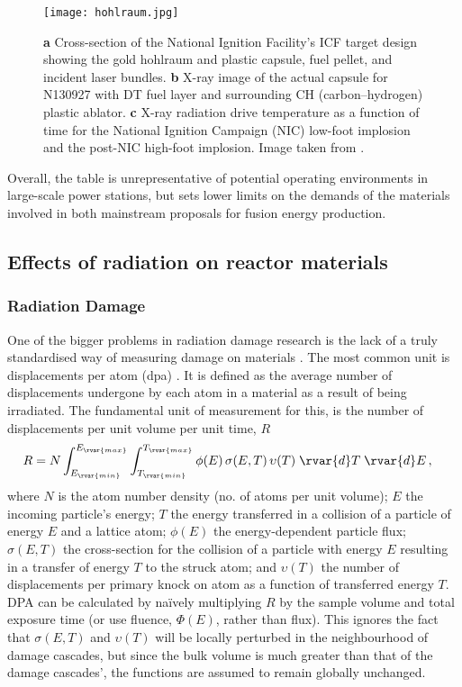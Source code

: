 \begin{figure}
  \centering
  \texttt{[image: hohlraum.jpg]}
  \caption[Hohlraum design for indirect drive in Inertial Confinement Fusion.]{\textbf{a} Cross-section of the National Ignition Facility's ICF target design showing the gold hohlraum and plastic capsule, fuel pellet, and incident laser bundles. \textbf{b} X-ray image of the actual capsule for N130927 with DT fuel layer and surrounding CH (carbon–hydrogen) plastic ablator. \textbf{c} X-ray radiation drive temperature as a function of time for the National Ignition Campaign (NIC) low-foot implosion and the post-NIC high-foot implosion. Image taken from \cite{hohlraum}.}
  \label{f:hohlraum}
\end{figure}

Overall, the table is unrepresentative of potential operating environments in large-scale power stations, but sets lower limits on the demands of the materials involved in both mainstream proposals for fusion energy production.

\subsection{Effects of radiation on reactor materials}
\label{ss:rad_effect_mat}

\subsubsection{Radiation Damage}
\label{sss:rad_damage}

One of the bigger problems in radiation damage research is the lack of a truly standardised way of measuring damage on materials \cite{srimisbad}. The most common unit is displacements per atom (dpa) \cite{dpa}. It is defined as the average number of displacements undergone by each atom in a material as a result of being irradiated. The fundamental unit of measurement for this, is the number of displacements per unit volume per unit time, $R$
\begin{align}\label{eq:dpa}
  R & = N\int _{E_{\rvar{min}}}^{E_{\rvar{max}}}\int _{T_{\rvar{min}}}^{T_{\rvar{max}}}\phi (E)\,\sigma (E,T)\,\upsilon (T)\;\rvar{d}T\;\rvar{d}E\,,
\end{align}
where $ N $ is the atom number density (no. of atoms per unit volume); $ E $ the incoming particle's energy; $ T $ the energy transferred in a collision of a particle of energy $E$ and a lattice atom; $ \phi(E) $ the energy-dependent particle flux; $ \sigma(E,T) $ the cross-section for the collision of a particle with energy $ E $ resulting in a transfer of energy $ T $ to the struck atom; and $ \upsilon(T) $ the number of displacements per primary knock on atom as a function of transferred energy $ T $. DPA can be calculated by na\"{i}vely multiplying $ R $ by the sample volume and total exposure time (or use fluence, $\Phi(E)$, rather than flux). This ignores the fact that $\sigma (E,T)$ and $\upsilon (T)$ will be locally perturbed in the neighbourhood of damage cascades, but since the bulk volume is much greater than that of the damage cascades', the functions are assumed to remain globally unchanged.

